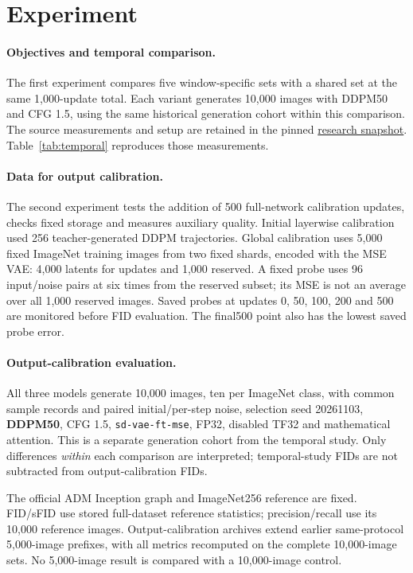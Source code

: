 \documentclass{article}
\begin{document}
\section{Experiment}
\paragraph{Objectives and temporal comparison.}
The first experiment compares five window-specific sets with a shared set at the same 1,000-update total. Each variant generates 10,000 images with DDPM50 and CFG 1.5, using the same historical generation cohort within this comparison. The source measurements and setup are retained in the pinned \href{https://github.com/YaguarEgor/diffusion_models_vector_quantization/blob/9d553985ae90bce6f90f0972e26e7f065e889385/docs/EXPERIMENTS.md}{research snapshot}. Table~\ref{tab:temporal} reproduces those measurements.

\paragraph{Data for output calibration.}
The second experiment tests the addition of 500 full-network calibration updates, checks fixed storage and measures auxiliary quality. Initial layerwise calibration used 256 teacher-generated DDPM trajectories. Global calibration uses 5,000 fixed ImageNet training images from two fixed shards, encoded with the MSE VAE: 4,000 latents for updates and 1,000 reserved. A fixed probe uses 96 input/noise pairs at six times from the reserved subset; its MSE is not an average over all 1,000 reserved images. Saved probes at updates 0, 50, 100, 200 and 500 are monitored before FID evaluation. The final500 point also has the lowest saved probe error.

\paragraph{Output-calibration evaluation.}
All three models generate 10,000 images, ten per ImageNet class, with common sample records and paired initial/per-step noise, selection seed 20261103, \textbf{DDPM50}, CFG 1.5, \texttt{sd-vae-ft-mse}, FP32, disabled TF32 and mathematical attention. This is a separate generation cohort from the temporal study. Only differences \emph{within} each comparison are interpreted; temporal-study FIDs are not subtracted from output-calibration FIDs.

The official ADM Inception graph and ImageNet256 reference are fixed. FID/sFID use stored full-dataset reference statistics; precision/recall use its 10,000 reference images. Output-calibration archives extend earlier same-protocol 5,000-image prefixes, with all metrics recomputed on the complete 10,000-image sets. No 5,000-image result is compared with a 10,000-image control.
\end{document}
